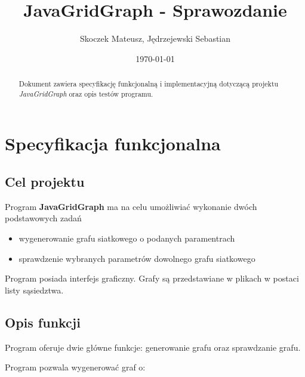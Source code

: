 \documentclass[11pt,a4paper]{report}
\title{\Huge JavaGridGraph - Sprawozdanie}
\author{Skoczek Mateusz, Jędrzejewski Sebastian}
\date{\today}
\begin{document}
    \maketitle
        




    \begin{abstract}
        Dokument zawiera specyfikację funkcjonalną i implementacyjną dotyczącą projektu \textsl{JavaGridGraph} oraz opis testów programu.
    \end{abstract}





    \tableofcontents
    \thispagestyle{empty}





    \newpage
    \chapter{Specyfikacja funkcjonalna}




    \newpage
    \section{Cel projektu}

    Program \textbf{JavaGridGraph} ma na celu umożliwiać wykonanie dwóch podstawowych zadań

    \begin{itemize}
        \item wygenerowanie grafu siatkowego o podanych paramentrach
        \item sprawdzenie wybranych parametrów dowolnego grafu siatkowego
    \end{itemize}

    Program posiada interfejs graficzny. Grafy są przedstawiane w plikach w postaci listy sąsiedztwa.




    \newpage
    \section{Opis funkcji}

    Program oferuje dwie główne funkcje: generowanie grafu oraz sprawdzanie grafu.

    \vspace{4em}

    Program pozwala wygenerować graf o:
    
\end{document}
